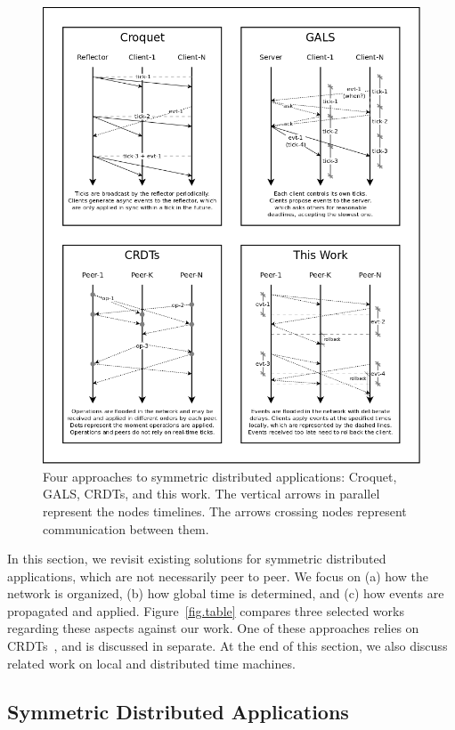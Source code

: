 \documentclass[10pt,journal,compsoc]{IEEEtran}
\begin{document}
\begin{figure}
  \centering
  \includegraphics[width=\linewidth]{algos}
  \caption{
    \label{fig.algos}
    Four approaches to symmetric distributed applications: Croquet, GALS,
    CRDTs, and this work.
    The vertical arrows in parallel represent the nodes timelines.
    The arrows crossing nodes represent communication between them.
  }
\end{figure}

In this section, we revisit existing solutions for symmetric distributed
applications, which are not necessarily peer to peer.
We focus on
    (a) how the network is organized,
    (b) how global time is determined, and
    (c) how events are propagated and applied.
Figure~\ref{fig.table} compares three selected works regarding these aspects
against our work.
%
One of these approaches relies on CRDTs~\cite{crdts}, and is discussed in
separate.
%
At the end of this section, we also discuss related work on local and
distributed time machines.

\subsection{Symmetric Distributed Applications}
\end{document}
